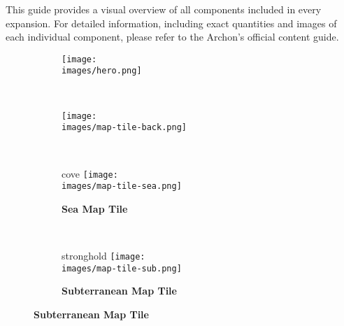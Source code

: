 
This guide provides a visual overview of all components included in every expansion. For detailed information, including exact quantities and images of each individual component, please refer to the Archon's official content guide.

\vspace*{-1em}
\begin{figure}[H]
  \centering
  \begin{subfigure}[c]{0.25\linewidth}
    \texttt{[image: \\images/hero.png]}
    \caption{\textbf{}}
  \end{subfigure}
  ~
  \begin{subfigure}[c]{0.25\linewidth}
    \centering
    \texttt{[image: \\images/map-tile-back.png]}
    \caption{\textbf{}}
  \end{subfigure}
  ~
  \begin{subfigure}[c]{0.17\linewidth}
    \begin{expansionmini}{cove}
      \centering
      \texttt{[image: \\images/map-tile-sea.png]}
      \caption{\textbf{Sea Map Tile}}
    \end{expansionmini}
  \end{subfigure}
  ~
  \begin{subfigure}[c]{0.17\linewidth}
    \begin{expansionmini}{stronghold}
      \centering
      \texttt{[image: \\images/map-tile-sub.png]}
      \caption{\textbf{Subterranean Map Tile}}
    \end{expansionmini}
  \end{subfigure}
\end{figure}
\vspace*{-1.7em}
